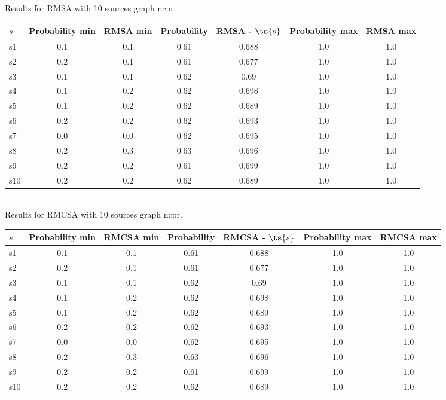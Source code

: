\documentclass{article}
\begin{document}
\noindent Results for RMSA with 10 sources graph ncpr.

\noindent\begin{tabular}{|l|c|c|c|c|c|c|}
\hline
$s$& Probability min & RMSA min & Probability & RMSA - $\ts{s}$ & Probability max & RMSA max\\
\hline
s1 &0.1 & 0.1 & 0.61 & 0.688 & 1.0 & 1.0\\
\hline
s2 &0.2 & 0.1 & 0.61 & 0.677 & 1.0 & 1.0\\
\hline
s3 &0.1 & 0.1 & 0.62 & 0.69 & 1.0 & 1.0\\
\hline
s4 &0.1 & 0.2 & 0.62 & 0.698 & 1.0 & 1.0\\
\hline
s5 &0.1 & 0.2 & 0.62 & 0.689 & 1.0 & 1.0\\
\hline
s6 &0.2 & 0.2 & 0.62 & 0.693 & 1.0 & 1.0\\
\hline
s7 &0.0 & 0.0 & 0.62 & 0.695 & 1.0 & 1.0\\
\hline
s8 &0.2 & 0.3 & 0.63 & 0.696 & 1.0 & 1.0\\
\hline
s9 &0.2 & 0.2 & 0.61 & 0.699 & 1.0 & 1.0\\
\hline
s10 &0.2 & 0.2 & 0.62 & 0.689 & 1.0 & 1.0\\
\hline
\end{tabular}\\

\noindent Results for RMCSA with 10 sources graph ncpr.

\noindent\begin{tabular}{|l|c|c|c|c|c|c|}
\hline
$s$& Probability min & RMCSA min & Probability & RMCSA - $\ts{s}$ & Probability max & RMCSA max\\
\hline
s1 &0.1 & 0.1 & 0.61 & 0.688 & 1.0 & 1.0\\
\hline
s2 &0.2 & 0.1 & 0.61 & 0.677 & 1.0 & 1.0\\
\hline
s3 &0.1 & 0.1 & 0.62 & 0.69 & 1.0 & 1.0\\
\hline
s4 &0.1 & 0.2 & 0.62 & 0.698 & 1.0 & 1.0\\
\hline
s5 &0.1 & 0.2 & 0.62 & 0.689 & 1.0 & 1.0\\
\hline
s6 &0.2 & 0.2 & 0.62 & 0.693 & 1.0 & 1.0\\
\hline
s7 &0.0 & 0.0 & 0.62 & 0.695 & 1.0 & 1.0\\
\hline
s8 &0.2 & 0.3 & 0.63 & 0.696 & 1.0 & 1.0\\
\hline
s9 &0.2 & 0.2 & 0.61 & 0.699 & 1.0 & 1.0\\
\hline
s10 &0.2 & 0.2 & 0.62 & 0.689 & 1.0 & 1.0\\
\hline
\end{tabular}\\
\end{document}
